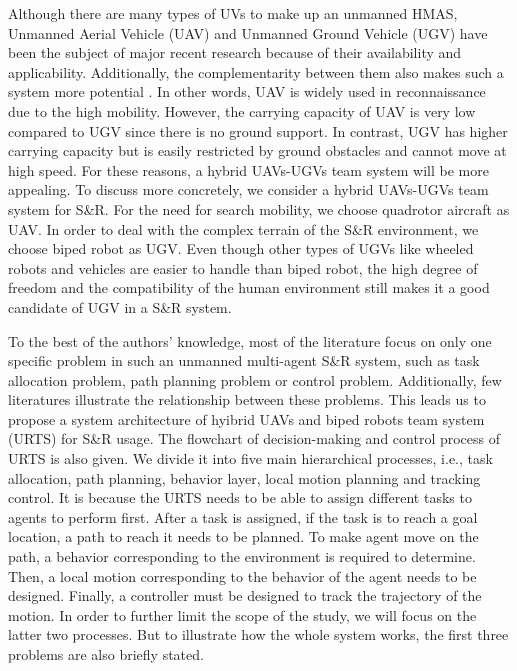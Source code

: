 \documentclass{ieeeaccess}
\begin{document}
Although there are many types of UVs to make up an unmanned HMAS, Unmanned Aerial Vehicle (UAV) and Unmanned Ground Vehicle (UGV) have been the subject of major recent research because of their availability and applicability. Additionally, the complementarity between them also makes such a system more potential \cite{arbanas2018decentralized}. In other words, UAV is widely used in reconnaissance due to the high mobility. However, the carrying capacity of UAV is very low compared to UGV since there is no ground support. In contrast, UGV has higher carrying capacity but is easily restricted by ground obstacles and cannot move at high speed. For these reasons, a hybrid UAVs-UGVs team system will be more appealing. To discuss more concretely, we consider a hybrid UAVs-UGVs team system for S\&R. For the need for search mobility, we choose quadrotor aircraft as UAV. In order to deal with the complex terrain of the S\&R environment, we choose biped robot as UGV. Even though other types of UGVs like wheeled robots and vehicles are easier to handle than biped robot, the high degree of freedom and the compatibility of the human environment still makes it a good candidate of UGV in a S\&R system.

To the best of the authors' knowledge, most of the literature focus on only one specific problem in such an unmanned multi-agent S\&R system, such as task allocation problem, path planning problem or control problem. Additionally, few literatures illustrate the relationship between these problems. This leads us to propose a system architecture of hyibrid UAVs and biped robots team system (URTS) for S\&R usage. The flowchart of decision-making and control process of URTS is also given. We divide it into five main hierarchical processes, i.e., task allocation, path planning, behavior layer, local motion planning and tracking control. It is because the URTS needs to be able to assign different tasks to agents to perform first. After a task is assigned, if the task is to reach a goal location, a path to reach it needs to be planned. To make agent move on the path, a behavior corresponding to the environment is required to determine. Then, a local motion corresponding to the behavior of the agent needs to be designed. Finally, a controller must be designed to track the trajectory of the motion. In order to further limit the scope of the study, we will focus on the latter two processes. But to illustrate how the whole system works, the first three problems are also briefly stated.
\end{document}
